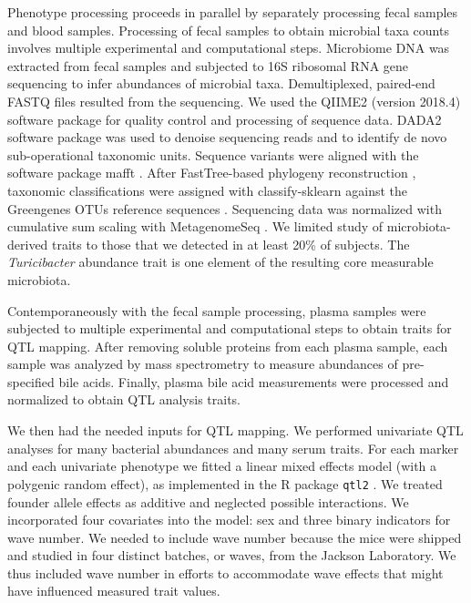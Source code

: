 \documentclass[oneside]{book}\usepackage[]{graphicx}\usepackage[]{color}
\begin{document}
Phenotype processing proceeds in parallel by separately processing fecal samples and blood samples. Processing of fecal samples to obtain microbial taxa counts 
involves multiple experimental and computational steps. 
Microbiome DNA was extracted from fecal 
samples and subjected to 16S ribosomal RNA gene sequencing to infer 
abundances of microbial taxa. 
Demultiplexed, 
paired-end FASTQ files resulted from the sequencing. 
We used the 
QIIME2 (version 2018.4) software package \citep{bolyen2018qiime} for quality control and 
processing of sequence data. 
DADA2 software package \citep{callahan2016dada2} was used to denoise sequencing reads and to identify de novo sub-operational 
taxonomic units. Sequence variants were aligned with the software 
package mafft \citep{katoh2013mafft}. 
After FastTree-based phylogeny reconstruction \citep{price2010fasttree}, taxonomic classifications were assigned with classify-sklearn against the 
Greengenes OTUs reference sequences \citep{desantis2006greengenes}. 
Sequencing data was normalized
with cumulative sum scaling with MetagenomeSeq \citep{paulson2013metagenomeseq}. 
We limited study of 
microbiota-derived traits to those that we detected in at least 20\% 
of subjects. 
The \emph{Turicibacter} abundance trait is one element 
of the resulting core measurable microbiota. 


Contemporaneously with the fecal sample processing, plasma samples were subjected to multiple experimental and computational steps to obtain traits for QTL mapping. 
After removing soluble 
proteins from each plasma sample, each sample was analyzed by mass spectrometry to 
measure abundances 
of pre-specified bile acids. 
Finally, plasma bile 
acid measurements were processed and normalized to obtain QTL analysis traits.




We then had the needed inputs for QTL mapping. 
We performed univariate QTL analyses for many bacterial abundances and many serum traits. 
For each marker and each univariate phenotype we fitted a linear mixed effects model (with a polygenic random effect), 
as implemented in the R package \texttt{qtl2} \citep{broman2019rqtl2}. 
We treated founder allele effects as additive and neglected possible interactions. 
We incorporated four covariates into the model: sex and three binary indicators for wave number. We needed to include wave number because the mice were shipped and studied in four distinct batches, or waves, from the Jackson Laboratory. We thus included wave number in efforts to accommodate wave effects that might have influenced measured trait values.
\end{document}
